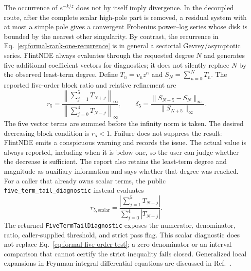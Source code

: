 \documentclass[11pt]{article}
\begin{document}
The occurrence of $e^{-k/z}$ does not by itself imply divergence.  In the decoupled route,
after the complete scalar high-pole part is removed, a residual system with at most a simple
pole gives a convergent Frobenius power--log series whose disk is bounded by the nearest other
singularity.  By contrast, the recurrence in Eq.~\eqref{eq:formal-rank-one-recurrence} is in
general a sectorial Gevrey/asymptotic series.  FlintNDE always evaluates through the requested
degree $N$ and generates five additional coefficient vectors for diagnostics; it does not
silently replace $N$ by the observed least-term degree.  Define $T_n=v_nz^n$ and
$S_N=\sum_{n=0}^{N}T_n$.  The reported five-order block ratio and relative refinement are
\begin{equation}
 r_5=\frac{\left\|\sum_{j=1}^{5}T_{N+j}\right\|_\infty}
 {\left\|\sum_{j=0}^{4}T_{N-j}\right\|_\infty},
 \qquad
 \delta_5=\frac{\|S_{N+5}-S_N\|_\infty}{\|S_{N+5}\|_\infty}.
 \label{eq:formal-five-order-test}
\end{equation}
The five vector terms are summed before the infinity norm is taken.  The desired decreasing-block
condition is $r_5<1$.  Failure does not suppress the result: FlintNDE emits a conspicuous warning
and records the issue.  The actual value is always reported, including when it is below one, so
the user can judge whether the decrease is sufficient.  The report also retains the least-term
degree and magnitude as auxiliary information and says whether that degree was reached.
For a caller that already owns scalar terms, the public
\texttt{five\_term\_tail\_diagnostic} instead evaluates
\begin{equation}
 r_{5,\mathrm{scalar}}=
 \frac{\left|\sum_{j=1}^{5}T_{N+j}\right|}
 {\sum_{j=0}^{4}\left|T_{N-j}\right|}.
 \label{eq:public-scalar-five-order-test}
\end{equation}
The returned \texttt{FiveTermTailDiagnostic} exposes the numerator, denominator, ratio,
caller-supplied threshold, and strict pass flag.  This scalar diagnostic does not replace
Eq.~\eqref{eq:formal-five-order-test}; a zero denominator or an interval comparison that cannot
certify the strict inequality fails closed.
Generalized local expansions in Feynman-integral differential equations are discussed in
Ref.~\cite{Moriello:2019yhu}.
\end{document}
